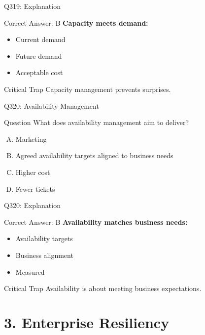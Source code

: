 \documentclass{beamer}
\begin{document}
	\begin{frame}{Q319: Explanation}
		\begin{block}{Correct Answer: B}
			\textbf{Capacity meets demand:}
			\begin{itemize}
				\item Current demand
				\item Future demand
				\item Acceptable cost
			\end{itemize}
		\end{block}
		\begin{alertblock}{Critical Trap}
			Capacity management prevents surprises.
		\end{alertblock}
	\end{frame}
	
	\begin{frame}{Q320: Availability Management}
		\begin{block}{Question}
			What does availability management aim to deliver?
		\end{block}
		\begin{enumerate}[(A)]
			\item Marketing
			\item Agreed availability targets aligned to business needs
			\item Higher cost
			\item Fewer tickets
		\end{enumerate}
	\end{frame}
	
	\begin{frame}{Q320: Explanation}
		\begin{block}{Correct Answer: B}
			\textbf{Availability matches business needs:}
			\begin{itemize}
				\item Availability targets
				\item Business alignment
				\item Measured
			\end{itemize}
		\end{block}
		\begin{alertblock}{Critical Trap}
			Availability is about meeting business expectations.
		\end{alertblock}
	\end{frame}
	
	\section{3. Enterprise Resiliency}
	
\end{document}
